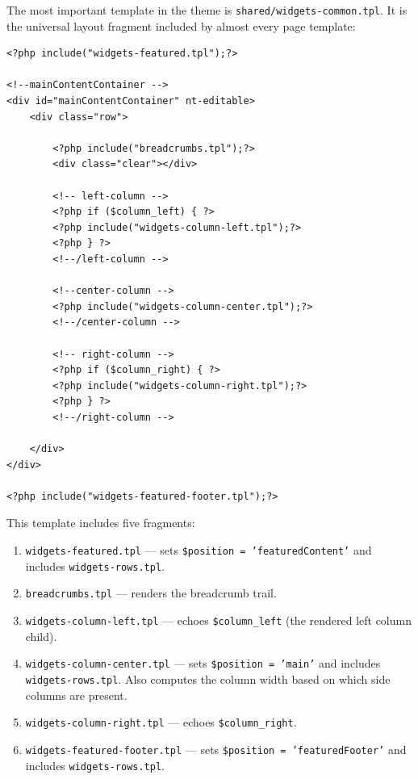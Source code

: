 \documentclass[11pt,a4paper]{article}
\begin{document}
The most important template in the theme is
\texttt{shared/widgets-common.tpl}. It is the universal layout fragment
included by almost every page template:

\begin{lstlisting}[caption={\texttt{shared/widgets-common.tpl} --- the universal layout fragment.},label={lst:widgets-common}]
<?php include("widgets-featured.tpl");?>

<!--mainContentContainer -->
<div id="mainContentContainer" nt-editable>
    <div class="row">

        <?php include("breadcrumbs.tpl");?>
        <div class="clear"></div>

        <!-- left-column -->
        <?php if ($column_left) { ?>
        <?php include("widgets-column-left.tpl");?>
        <?php } ?>
        <!--/left-column -->

        <!--center-column -->
        <?php include("widgets-column-center.tpl");?>
        <!--/center-column -->

        <!-- right-column -->
        <?php if ($column_right) { ?>
        <?php include("widgets-column-right.tpl");?>
        <?php } ?>
        <!--/right-column -->

    </div>
</div>

<?php include("widgets-featured-footer.tpl");?>
\end{lstlisting}

This template includes five fragments:
\begin{enumerate}[leftmargin=1.6em,itemsep=2pt]
  \item \texttt{widgets-featured.tpl} --- sets \texttt{\$position =
        'featuredContent'} and includes \texttt{widgets-rows.tpl}.
  \item \texttt{breadcrumbs.tpl} --- renders the breadcrumb trail.
  \item \texttt{widgets-column-left.tpl} --- echoes \texttt{\$column\_left}
        (the rendered left column child).
  \item \texttt{widgets-column-center.tpl} --- sets
        \texttt{\$position = 'main'} and includes
        \texttt{widgets-rows.tpl}. Also computes the column width based
        on which side columns are present.
  \item \texttt{widgets-column-right.tpl} --- echoes
        \texttt{\$column\_right}.
  \item \texttt{widgets-featured-footer.tpl} --- sets
        \texttt{\$position = 'featuredFooter'} and includes
        \texttt{widgets-rows.tpl}.
\end{enumerate}
\end{document}
